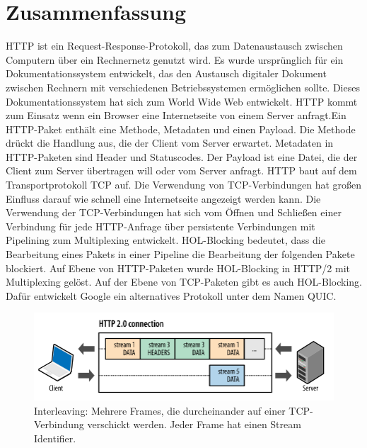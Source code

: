 \documentclass{llncs}
\begin{document}
\section{Zusammenfassung}
HTTP ist ein Request-Response-Protokoll, das zum Datenaustausch zwischen Computern über ein Rechnernetz genutzt wird. Es wurde ursprünglich für ein Dokumentationssystem entwickelt, das den Austausch digitaler Dokument zwischen Rechnern mit verschiedenen Betriebssystemen ermöglichen sollte. Dieses Dokumentationssystem hat sich zum World Wide Web entwickelt. 
HTTP kommt zum Einsatz wenn ein Browser eine Internetseite von einem Server anfragt.\newline Ein HTTP-Paket enthält eine Methode, Metadaten und einen Payload. Die Methode drückt die Handlung aus, die der Client vom Server erwartet. Metadaten in HTTP-Paketen sind Header und Statuscodes. Der Payload ist eine Datei, die der Client zum Server übertragen will oder vom Server anfragt. \newline
HTTP baut auf dem Transportprotokoll TCP auf.
Die Verwendung von TCP-Verbindungen hat großen Einfluss darauf wie schnell eine Internetseite angezeigt werden kann. Die Verwendung der TCP-Verbindungen hat sich vom Öffnen und Schließen einer Verbindung für jede HTTP-Anfrage über persistente Verbindungen mit Pipelining zum Multiplexing entwickelt. \newline
HOL-Blocking bedeutet, dass die Bearbeitung eines Pakets in einer Pipeline die Bearbeitung der folgenden Pakete blockiert. Auf Ebene von HTTP-Paketen wurde HOL-Blocking in HTTP/2 mit Multiplexing gelöst.
 Auf der Ebene von TCP-Paketen gibt es auch HOL-Blocking. Dafür entwickelt Google ein alternatives Protokoll unter dem Namen QUIC.
 \begin{figure}[!ht]
\includegraphics[width=\columnwidth]{Multiplexing.png}
\caption{Interleaving: Mehrere Frames, die durcheinander auf einer TCP-Verbindung verschickt werden. Jeder Frame hat einen Stream Identifier.}
\end{figure}


\end{document}

